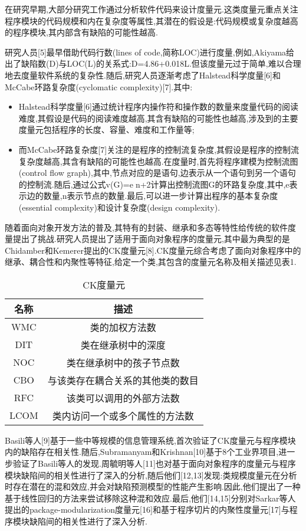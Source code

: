 \documentclass{rjthesis}
\begin{document}
	在研究早期,大部分研究工作通过分析软件代码来设计度量元.这类度量元重点关注程序模块的代码规模和内在复杂度等属性,其潜在的假设是:代码规模或复杂度越高的程序模块,其内部含有缺陷的可能性越高.
	
	研究人员[5]最早借助代码行数(lines of code,简称LOC)进行度量,例如,Akiyama给出了缺陷数(D)与LOC(L)的关系式:D=4.86+0.018L.但该度量元过于简单,难以合理地去度量软件系统的复杂性.随后,研究人员逐渐考虑了Halstead科学度量[6]和McCabe环路复杂度(cyclomatic complexity)[7].其中:
	
	\begin{itemize}
		\item Halstead科学度量[6]通过统计程序内操作符和操作数的数量来度量代码的阅读难度,其假设是代码的阅读难度越高,其含有缺陷的可能性也越高,涉及到的主要度量元包括程序的长度、容量、难度和工作量等;
		\item 而McCabe环路复杂度[7]关注的是程序的控制流复杂度,其假设是程序的控制流复杂度越高,其含有缺陷的可能性也越高.在度量时,首先将程序建模为控制流图(control flow graph),其中,节点对应的是语句,边表示从一个语句到另一个语句的控制流.随后,通过公式v(G)=en+2计算出控制流图G的环路复杂度,其中,e表示边的数量,n表示节点的数量.最后,可以进一步计算出程序的基本复杂度(essential complexity)和设计复杂度(design complexity).
		
	\end{itemize}
	
	随着面向对象开发方法的普及,其特有的封装、继承和多态等特性给传统的软件度量提出了挑战.研究人员提出了适用于面向对象程序的度量元,其中最为典型的是Chidamber和Kemerer提出的CK度量元[8].CK度量元综合考虑了面向对象程序中的继承、耦合性和内聚性等特征,给定一个类,其包含的度量元名称及相关描述见表1.
	\begin{table}[h]
		\centering
		\caption{CK度量元}
		\begin{tabular}{cc}
			\toprule
			名称  & 描述\\
			\midrule
			WMC  & 类的加权方法数\\
			DIT  & 类在继承树中的深度\\
			NOC  & 类在继承树中的孩子节点数\\
			CBO  & 与该类存在耦合关系的其他类的数目\\
			RFC  & 该类可以调用的外部方法数\\
			LCOM & 类内访问一个或多个属性的方法数\\
			\bottomrule		
		\end{tabular}
	\end{table}
	
	Basili等人[9]基于一些中等规模的信息管理系统,首次验证了CK度量元与程序模块内的缺陷存在相关性.随后,Subramanyam和Krishnan[10]基于8个工业界项目,进一步验证了Basili等人的发现.周毓明等人[11]也对基于面向对象程序的度量元与程序模块缺陷间的相关性进行了深入的分析,随后他们[12,13]发现:类规模度量元在分析时存在潜在的混和效应,并会对缺陷预测模型的性能产生影响.因此,他们提出了一种基于线性回归的方法来尝试移除这种混和效应.最后,他们[14,15]分别对Sarkar等人提出的package-modularization度量元[16]和基于程序切片的内聚性度量元[17]与程序模块缺陷间的相关性进行了深入分析.
\end{document}
